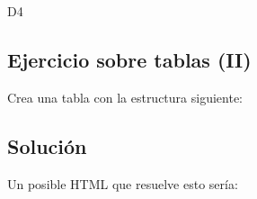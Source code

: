 \documentclass[letterpaper,10pt,spanish]{sphinxmanual}
\begin{document}
\begin{sphinxVerbatim}[commandchars=\\\{\}]
                                                D4
\end{sphinxVerbatim}


\subsection{Ejercicio sobre tablas (II)}
\label{\detokenize{tema2:ejercicio-sobre-tablas-ii}}
Crea una tabla con la estructura siguiente:



\subsection{Solución}
\label{\detokenize{tema2:id1}}
Un posible HTML que resuelve esto sería:
\end{document}
